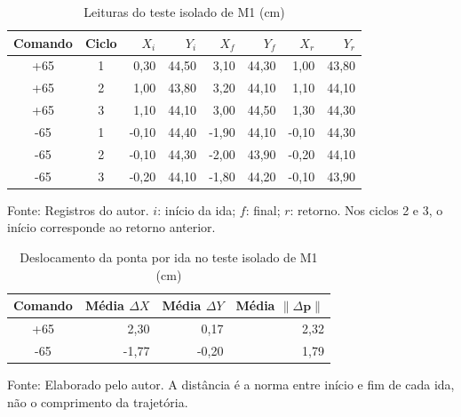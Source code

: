 \begin{table}[H]\centering
\caption{Leituras do teste isolado de M1 (cm)}\label{tab:m1-leituras}
\small\begin{tabular}{ccrrrrrr}\toprule
Comando & Ciclo & $X_i$ & $Y_i$ & $X_f$ & $Y_f$ & $X_r$ & $Y_r$\\\midrule
+65 & 1 & 0,30 & 44,50 & 3,10 & 44,30 & 1,00 & 43,80\\
+65 & 2 & 1,00 & 43,80 & 3,20 & 44,10 & 1,10 & 44,10\\
+65 & 3 & 1,10 & 44,10 & 3,00 & 44,50 & 1,30 & 44,30\\
-65 & 1 & -0,10 & 44,40 & -1,90 & 44,10 & -0,10 & 44,30\\
-65 & 2 & -0,10 & 44,30 & -2,00 & 43,90 & -0,20 & 44,10\\
-65 & 3 & -0,20 & 44,10 & -1,80 & 44,20 & -0,10 & 43,90\\
\bottomrule\end{tabular}\par\smallskip
{\footnotesize Fonte: Registros do autor. $i$: início da ida; $f$: final; $r$: retorno. Nos ciclos 2 e 3, o início corresponde ao retorno anterior.}\end{table}
\begin{table}[H]\centering
\caption{Deslocamento da ponta por ida no teste isolado de M1 (cm)}\label{tab:m1-deslocamento}
\small\begin{tabular}{crrr}\toprule Comando & Média $\Delta X$ & Média $\Delta Y$ & Média $\|\Delta\boldsymbol p\|$\\\midrule
+65 & 2,30 & 0,17 & 2,32\\
-65 & -1,77 & -0,20 & 1,79\\
\bottomrule\end{tabular}\par\smallskip
{\footnotesize Fonte: Elaborado pelo autor. A distância é a norma entre início e fim de cada ida, não o comprimento da trajetória.}\end{table}
